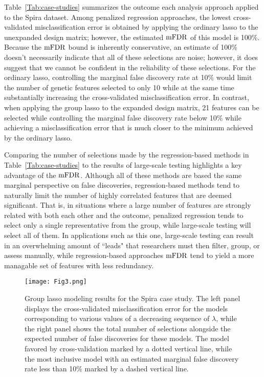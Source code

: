 Table~\ref{Tab:case-studies} summarizes the outcome each analysis approach applied to the Spira dataset.  Among penalized regression approaches, the lowest cross-validated misclassification error is obtained by applying the ordinary lasso to the unexpanded design matrix; however, the estimated $\textrm{mFDR}$ of this model is 100\%.  Because the $\textrm{mFDR}$ bound is inherently conservative, an estimate of 100\% doesn't necessarily indicate that all of these selections are noise; however, it does suggest that we cannot be confident in the reliability of these selections. For the ordinary lasso, controlling the marginal false discovery rate at 10\% would limit the number of genetic features selected to only 10 while at the same time substantially increasing the cross-validated misclassification error.  In contrast, when applying the group lasso to the expanded design matrix, 21 features can be selected while controlling the marginal false discovery rate below 10\% while achieving a misclassification error that is much closer to the minimum achieved by the ordinary lasso. 

Comparing the number of selections made by the regression-based methods in Table~\ref{Tab:case-studies} to the results of large-scale testing highlights a key advantage of the $\textrm{mFDR}$.  Although all of these methods are based the same marginal perspective on false discoveries, regression-based methods tend to naturally limit the number of highly correlated features that are deemed significant.  That is, in situations where a large number of features are strongly related with both each other and the outcome, penalized regression tends to select only a single representative from the group, while large-scale testing will select all of them.  In applications such as this one, large-scale testing can result in an overwhelming amount of ``leads" that researchers must then filter, group, or assess manually, while regression-based approaches $\textrm{mFDR}$ tend to yield a more managable set of features with less redundancy. 

\begin{figure} [!htb]
 \centering
  \texttt{[image: Fig3.png]}
  \caption{\label{Fig:casestudy} Group lasso modeling results for the Spira case study.  The left panel displays the cross-validated misclassification error for the models corresponding to various values of a decreasing sequence of $\lambda$, while the right panel shows the total number of selections alongside the expected number of false discoveries for these models.  The model favored by cross-validation marked by a dotted vertical line, while the most inclusive model with an estimated marginal false discovery rate less than 10\% marked by a dashed vertical line. }
\end{figure}

